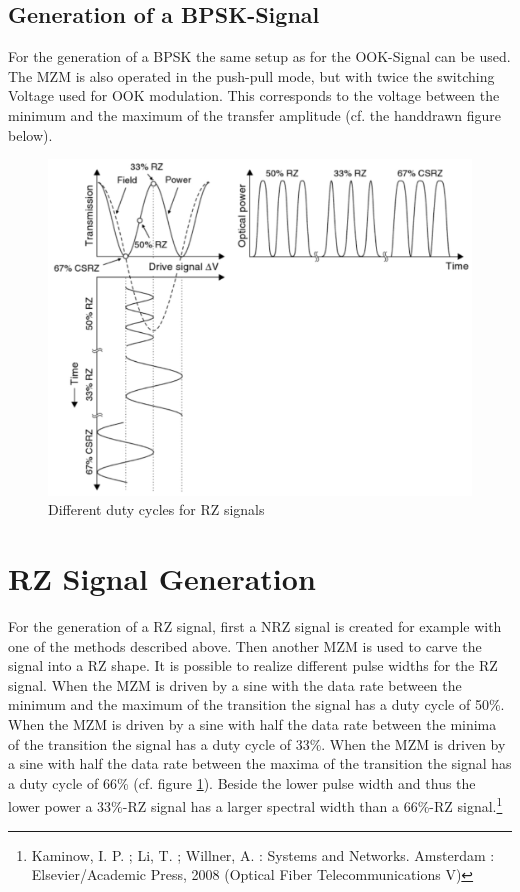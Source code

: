 \subsection{Generation of a BPSK-Signal}
For the generation of a BPSK the same setup as for the OOK-Signal can be used. The MZM is also operated in the push-pull mode, but with twice the switching Voltage used for OOK modulation. This corresponds to the voltage between the minimum and the maximum of the transfer amplitude (cf. the handdrawn figure below).\footnotemark[1]
\newpage
\begin{figure}
  \centering
  \includegraphics[width=.5\columnwidth]{Grafiken/RZ_OOK.jpg}
\caption{Different duty cycles for RZ signals}
\label{fig:RZ_OOK}
\end{figure}

\section{RZ Signal Generation}
For the generation of a RZ signal, first a NRZ signal is created for example with one of the methods described above. Then another MZM is used to carve the signal into a RZ shape. It is possible to realize different pulse widths for the RZ signal. When the MZM is driven by a sine with the data rate between the minimum and the maximum of the transition the signal has a duty cycle of 50\%. When the MZM is driven by a sine with half the data rate between the minima of the transition the signal has a duty cycle of 33\%. When the MZM is driven by a sine with half the data rate between the maxima of the transition the signal has a duty cycle of 66\% (cf. figure \ref{fig:RZ_OOK}). Beside the lower pulse width and thus the lower power a 33\%-RZ signal has a larger spectral width than a 66\%-RZ signal.\footnote[2]{Kaminow, I. P. ; Li, T. ; Willner, A. : Systems and Networks. Amsterdam :
Elsevier/Academic Press, 2008 (Optical Fiber Telecommunications V)}

